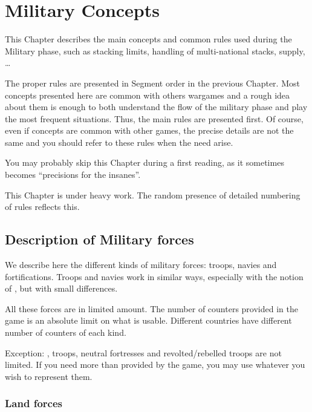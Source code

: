 
\chapter{Military Concepts}\label{chapter:MilitaryConcepts}

\begin{designnote}
  This Chapter describes the main concepts and common rules used
  during the Military phase, such as stacking limits, handling of
  multi-national stacks, supply, \ldots

  The proper rules are presented in Segment order in the previous
  Chapter. Most concepts presented here are common with others wargames and a
  rough idea about them is enough to both understand the flow of the military
  phase and play the most frequent situations. Thus, the main rules are
  presented first. Of course, even if concepts are common with other games,
  the precise details are not the same and you should refer to these rules
  when the need arise.

  You may probably skip this Chapter during a first reading, as it sometimes
  becomes ``precisions for the insanes''.
\end{designnote}

\begin{todo}
  This Chapter is under heavy work. The random presence of detailed numbering
  of rules reflects this.
\end{todo}

\section{Description of Military forces}

We describe here the different kinds of military forces: troops, navies and
fortifications. Troops and navies work in similar ways, especially with the
notion of , but with small differences.

All these forces are in limited amount. The number of counters provided in the
game is an absolute limit on what is usable. Different countries have
different number of counters of each kind.

Exception:  \corsaire,  troops, neutral fortresses
and revolted/rebelled troops are not limited. If you need more than provided
by the game, you may use whatever you wish to represent them.



\subsection{Land forces}


